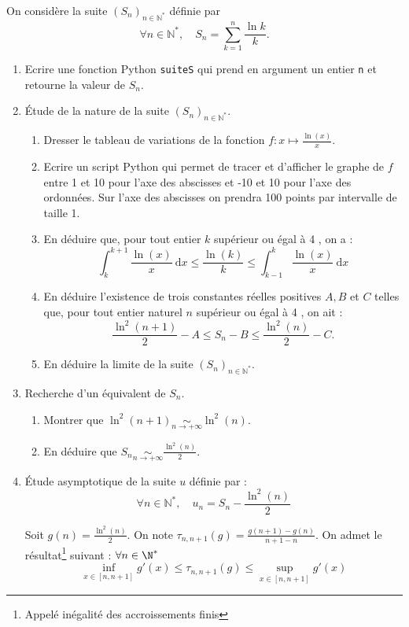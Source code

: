 \documentclass[a4paper, 11pt,reqno]{article}
\begin{document}
\begin{exercice}[Agro 2016]
On considère la suite $\left(S_n\right)_{n \in \mathbb{N}^*}$ définie par
$$
\forall n \in \mathbb{N}^*, \quad S_n=\sum_{k=1}^n \frac{\ln k}{k} .
$$
\begin{enumerate}

\item Ecrire une fonction Python \texttt{suiteS} qui prend en argument un entier \texttt{n} et retourne la valeur de $S_n$.
\item Étude de la nature de la suite $\left(S_n\right)_{n \in \mathbb{N}^*}$.
\begin{enumerate}
\item Dresser le tableau de variations de la fonction $f: x \mapsto \frac{\ln (x)}{x}$.
\item Ecrire un script Python  qui permet de tracer et d'afficher le graphe de $f$ entre 1 et 10 pour l'axe des abscisses et -10 et 10 pour l'axe des ordonnées. Sur l'axe des abscisses on prendra 100 points par intervalle de taille 1. 
\item En déduire que, pour tout entier $k$ supérieur ou égal à 4 , on a :
$$
\int_k^{k+1} \frac{\ln (x)}{x} \mathrm{~d} x \leq \frac{\ln (k)}{k} \leq \int_{k-1}^k \frac{\ln (x)}{x} \mathrm{~d} x
$$
\item En déduire l'existence de trois constantes réelles positives $A, B$ et $C$ telles que, pour tout entier naturel $n$ supérieur ou égal à 4 , on ait :
$$
\frac{\ln ^2(n+1)}{2}-A \leq S_n-B \leq \frac{\ln ^2(n)}{2}-C .
$$
\item En déduire la limite de la suite $\left(S_n\right)_{n \in \mathbb{N}^*}$.
\end{enumerate}
\item  Recherche d'un équivalent de $S_n$.
\begin{enumerate}
\item Montrer que $\ln ^2(n+1) \underset{n \rightarrow+\infty}{\sim} \ln ^2(n)$.
\item En déduire que $S_n \underset{n \rightarrow+\infty}{\sim} \frac{\ln ^2(n)}{2}$.

\end{enumerate} 
\item Étude asymptotique de la suite $u$ définie par :
$$
\forall n \in \mathbb{N}^*, \quad u_n=S_n-\frac{\ln ^2(n)}{2}
$$

Soit $g(n) =\frac{\ln^2(n)}{2}$. On note  $\tau_{n,n+1}(g) = \frac{g(n+1)-g(n)}{n+1- n }$. On admet le résultat\footnote{Appelé inégalité des accroissements finis} suivant : $\forall n\in \N^* $ 
$$\inf_{x\in [n,n+1] } g'(x)\leq \tau_{n,n+1}(g) \leq \sup_{x\in [n,n+1] } g'(x)$$


\end{enumerate}
\end{exercice}
\end{document}
